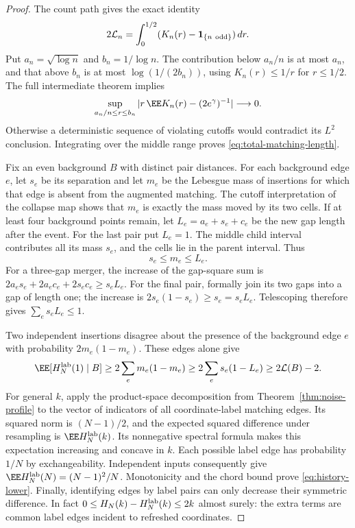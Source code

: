 \documentclass[11pt,letterpaper]{article}
\newcommand{\ind}{\mathbf 1}\newcommand{\Exp}{\operatorname{Exp}}
\begin{document}
\begin{proof}
The count path gives the exact identity
\[
 2\mathcal L_n=\int_0^{1/2}
                 (K_n(r)-\ind_{\{n\ {\rm odd}\}})\,dr.
\]
Put $a_n=\sqrt{\log n}$ and $b_n=1/\log n$.
The contribution below $a_n/n$ is at most $a_n$, and that above $b_n$
is at most $\log(1/(2b_n))$, using $K_n(r)\le1/r$ for $r\le1/2$.
The full intermediate theorem implies
\[
 \sup_{a_n/n\le r\le b_n}
   |r\,\EE K_n(r)-(2e^\gamma)^{-1}|\longrightarrow0.
\]
Otherwise a deterministic sequence of violating cutoffs would
contradict its $L^2$ conclusion. Integrating over the middle range
proves \eqref{eq:total-matching-length}.

Fix an even background $B$ with distinct pair distances. For each
background edge $e$, let $s_e$ be its separation and let $m_e$ be the
Lebesgue mass of insertions for which that edge is absent from the
augmented matching. The cutoff interpretation of the collapse map
shows that $m_e$ is exactly the mass moved by its two cells.
If at least four background points remain, let
$L_e=a_e+s_e+c_e$ be the new gap length after the event.
For the last pair put $L_e=1$. The middle child interval contributes
all its mass $s_e$, and the cells lie in the parent interval. Thus
\[
 s_e\le m_e\le L_e.
\]
For a three-gap merger, the increase of the gap-square sum is
$2a_es_e+2a_ec_e+2s_ec_e\ge s_eL_e$.
For the final pair, formally join its two gaps into a gap of length
one; the increase is $2s_e(1-s_e)\ge s_e=s_eL_e$.
Telescoping therefore gives $\sum_e s_eL_e\le1$.

Two independent insertions disagree about the presence of the
background edge $e$ with probability $2m_e(1-m_e)$. These edges alone
give
\[
 \EE[H_N^{\rm lab}(1)\mid B]\ge
 2\sum_e m_e(1-m_e)
 \ge2\sum_e s_e(1-L_e)\ge2\mathcal L(B)-2.
\]
For general $k$, apply the product-space decomposition from
Theorem~\ref{thm:noise-profile} to the vector of indicators of all
coordinate-label matching edges. Its squared norm is $(N-1)/2$,
and the expected squared difference under resampling is
$\EE H_N^{\rm lab}(k)$. Its nonnegative spectral formula makes this
expectation increasing and concave in $k$.
Each possible label edge has probability $1/N$ by exchangeability.
Independent inputs consequently give
$\EE H_N^{\rm lab}(N)=(N-1)^2/N$.
Monotonicity and the chord bound prove \eqref{eq:history-lower}.
Finally, identifying edges by label pairs can only decrease their
symmetric difference. In fact
$0\le H_N(k)-H_N^{\rm lab}(k)\le2k$ almost surely: the extra terms
are common label edges incident to refreshed coordinates.
\end{proof}
\end{document}
